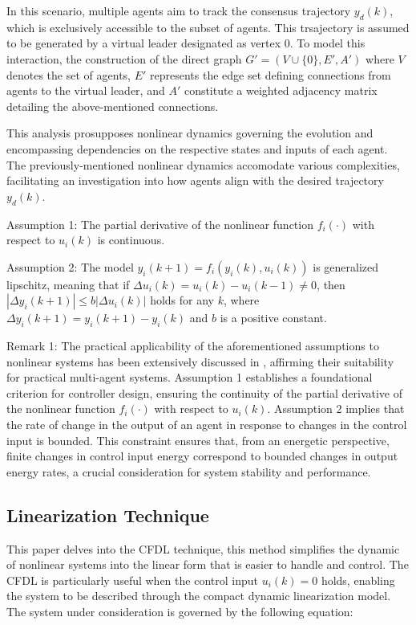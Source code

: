 \documentclass[journal,onecolumn]{IEEEtran}
\begin{document}
In this scenario, multiple agents aim to track the consensus trajectory \(y_d(k)\), which is exclusively accessible to the subset of agents. This trsajectory is assumed to be generated by a virtual leader designated as vertex 0. To model this interaction, the construction of the direct graph \( G' = (V \cup \{0\}, E', A') \) where \( V \) denotes the set of agents, \( E' \) represents the edge set defining connections from agents to the virtual leader, and \( A' \) constitute a weighted adjacency matrix detailing the above-mentioned connections.

This analysis prosupposes nonlinear dynamics governing the evolution and encompassing dependencies on the respective states and inputs of each agent. The previously-mentioned nonlinear dynamics accomodate various complexities, facilitating an investigation into how agents align with the desired trajectory \(y_d(k)\).

Assumption 1: The partial derivative of the nonlinear function \( f_i(\cdot) \) with respect to \( u_i(k) \) is continuous.

Assumption 2: The model \( y_i(k + 1) = f_i(y_i(k), u_i(k)) \) is generalized lipschitz, meaning that if \( \Delta u_i(k) = u_i(k) - u_i(k - 1) \neq 0 \), then \( | \Delta y_i(k + 1) | \leq b |\Delta u_i(k)| \) holds for any \( k \), where \( \Delta y_i(k + 1) = y_i(k + 1) - y_i(k) \) and \( b \) is a positive constant.

Remark 1: The practical applicability of the aforementioned assumptions to nonlinear systems has been extensively discussed in \cite{1}, affirming their suitability for practical multi-agent systems. Assumption 1 establishes a foundational criterion for controller design, ensuring the continuity of the partial derivative of the nonlinear function $f_i(\cdot)$ with respect to $u_i(k)$. Assumption 2 implies that the rate of change in the output of an agent in response to changes in the control input is bounded. This constraint ensures that, from an energetic perspective, finite changes in control input energy correspond to bounded changes in output energy rates, a crucial consideration for system stability and performance.

\subsection{Linearization Technique}

This paper delves into the CFDL technique, this method simplifies the dynamic of nonlinear systems into the linear form that is easier to handle and control. The CFDL is particularly useful when the control input \(u_i(k) = 0\) holds, enabling the system to be described through the compact dynamic linearization model. The system under consideration is governed by the following equation:
\end{document}
